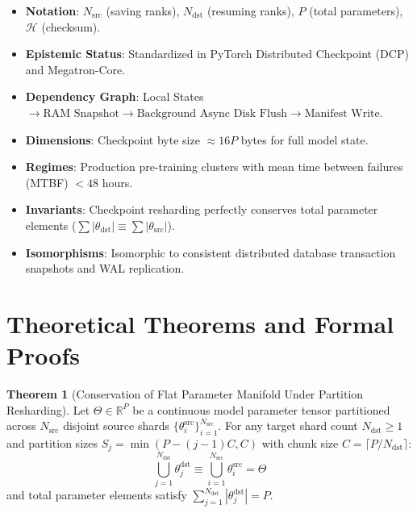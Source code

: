 \documentclass[11pt,a4paper]{article}
\theoremstyle{definition}
\newtheorem{theorem}{\textbf{Theorem}}[section]
\begin{document}
\begin{itemize}
    \item \textbf{Notation}: $N_{\text{src}}$ (saving ranks), $N_{\text{dst}}$ (resuming ranks), $P$ (total parameters), $\mathcal{H}$ (checksum).
    \item \textbf{Epistemic Status}: Standardized in PyTorch Distributed Checkpoint (DCP) and Megatron-Core.
    \item \textbf{Dependency Graph}: Local States $\to \text{RAM Snapshot} \to \text{Background Async Disk Flush} \to \text{Manifest Write}$.
    \item \textbf{Dimensions}: Checkpoint byte size $\approx 16P$ bytes for full model state.
    \item \textbf{Regimes}: Production pre-training clusters with mean time between failures (MTBF) $< 48$ hours.
    \item \textbf{Invariants}: Checkpoint resharding perfectly conserves total parameter elements ($\sum |\theta_{\text{dst}}| \equiv \sum |\theta_{\text{src}}|$).
    \item \textbf{Isomorphisms}: Isomorphic to consistent distributed database transaction snapshots and WAL replication.
\end{itemize}

\section{Theoretical Theorems and Formal Proofs}

\begin{theorem}[Conservation of Flat Parameter Manifold Under Partition Resharding]
Let $\Theta \in \mathbb{R}^P$ be a continuous model parameter tensor partitioned across $N_{\text{src}}$ disjoint source shards $\{\theta_i^{\text{src}}\}_{i=1}^{N_{\text{src}}}$. For any target shard count $N_{\text{dst}} \ge 1$ and partition sizes $S_j = \min(P - (j-1)C, C)$ with chunk size $C = \lceil P / N_{\text{dst}} \rceil$:
{\boldmath
\begin{equation}
\bigcup_{j=1}^{N_{\text{dst}}} \theta_j^{\text{dst}} \equiv \bigcup_{i=1}^{N_{\text{src}}} \theta_i^{\text{src}} = \Theta
\end{equation}
}
and total parameter elements satisfy $\sum_{j=1}^{N_{\text{dst}}} |\theta_j^{\text{dst}}| = P$.
\end{theorem}
\end{document}
